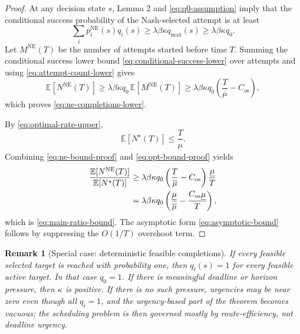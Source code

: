 \documentclass[11pt]{article}
\newtheorem{remark}{Remark}
\newcommand{\E}{\mathbb{E}}
\begin{document}
\begin{proof}
At any decision state $s$, Lemma 2 and \eqref{eq:q0-assumption} imply that the conditional success probability of
the Nash-selected attempt is at least
\begin{equation}
  \sum_i p_i^{\mathrm{NE}}(s)q_i(s)
  \ge
  \lambda\beta\kappa q_{\max}(s)
  \ge
  \lambda\beta\kappa q_0 .
  \label{eq:conditional-success-lower}
\end{equation}
Let $M^{\mathrm{NE}}(T)$ be the number of attempts started before time $T$. Summing the conditional success lower bound
\eqref{eq:conditional-success-lower} over attempts and using \eqref{eq:attempt-count-lower} gives
\begin{equation}
  \E[N^{\mathrm{NE}}(T)]
  \ge
  \lambda\beta\kappa q_0\, \E[M^{\mathrm{NE}}(T)]
  \ge
  \lambda\beta\kappa q_0
  \left(\frac{T}{\overline\mu}-C_{\mathrm{os}}\right),
  \label{eq:ne-bound-proof}
\end{equation}
which proves \eqref{eq:ne-completions-lower}.

By \eqref{eq:optimal-rate-upper},
\begin{equation}
  \E[N^\star(T)]\le \frac{T}{\underline\mu}.
  \label{eq:opt-bound-proof}
\end{equation}
Combining \eqref{eq:ne-bound-proof} and \eqref{eq:opt-bound-proof} yields
\begin{align}
  \frac{\E[N^{\mathrm{NE}}(T)]}{\E[N^\star(T)]}
  &\ge
  \lambda\beta\kappa q_0
  \left(\frac{T}{\overline\mu}-C_{\mathrm{os}}\right)
  \frac{\underline\mu}{T} \notag\\
  &=
  \lambda\beta\kappa q_0
  \left(
    \frac{\underline\mu}{\overline\mu}
    -
    \frac{C_{\mathrm{os}}\underline\mu}{T}
  \right),
  \label{eq:ratio-proof-step}
\end{align}
which is \eqref{eq:main-ratio-bound}. The asymptotic form \eqref{eq:asymptotic-bound} follows by suppressing the
$O(1/T)$ overshoot term.
\end{proof}

\begin{remark}[Special case: deterministic feasible completions]
If every feasible selected target is reached with probability one, then $q_i(s)=1$ for every feasible active target.
In that case $q_0=1$. If there is meaningful deadline or horizon pressure, then $\kappa$ is positive. If there is no
such pressure, urgencies may be near zero even though all $q_i=1$, and the urgency-based part of the theorem becomes
vacuous; the scheduling problem is then governed mostly by route-efficiency, not deadline urgency.
\end{remark}
\end{document}
